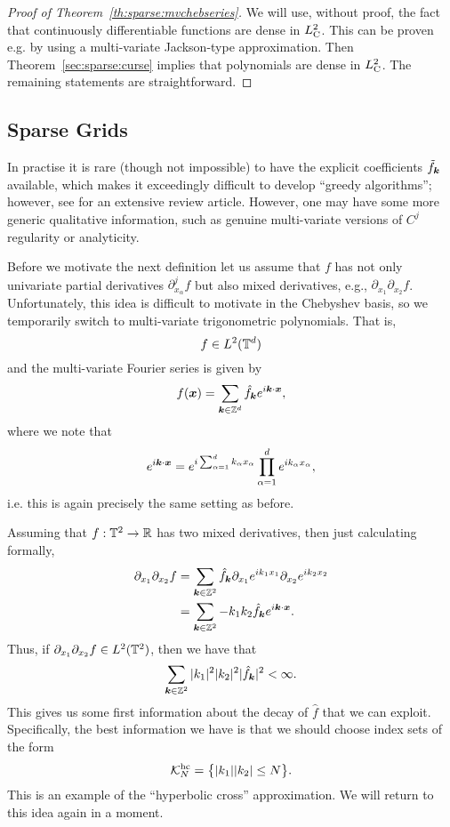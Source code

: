 \begin{proof}[Proof of Theorem~\ref{th:sparse:mvchebseries}]
    We will use, without proof, the fact that continuously differentiable
    functions are dense in $L^2_{\rm C}$. This can be proven e.g. by using a
    multi-variate Jackson-type approximation. Then Theorem~\ref{sec:sparse:curse}
    implies that polynomials are dense in $L^2_{\rm C}$. The remaining
    statements are straightforward.
\end{proof}



\subsection{Sparse Grids}
%
\label{sec:sparse:sparse}
%
In practise it is rare (though not impossible) to have the explicit coefficients
$\tilde{f}_{\bm k}$ available, which makes it exceedingly difficult to develop
``greedy algorithms''; however, see \cite{DeVore1998-do} for an extensive review
article. However, one may have some more generic qualitative information,
such as genuine multi-variate versions of $C^j$ regularity or analyticity.

Before we motivate the next definition let us assume that $f$ has not only
univariate partial derivatives $\partial_{x_\alpha}^j f$ but also mixed
derivatives, e.g., $\partial_{x_1} \partial_{x_2} f$. Unfortunately, this
idea is difficult to motivate in the Chebyshev basis, so we temporarily
switch to multi-variate trigonometric polynomials. That is,
\[
    f \in L^2(\mathbb{T}^d)
\]
and the multi-variate Fourier series is given by
\[
    f({\bm x}) = \sum_{{\bm k} \in \mathbb{Z}^d} \hat{f}_{\bm k}
        e^{i {\bm k}\cdot {\bm x}},
\]
where we note that
\[
    e^{i {\bm k}\cdot {\bm x}} =
    e^{i \sum_{\alpha = 1}^d k_\alpha x_\alpha}
    \prod_{\alpha = 1}^d e^{i k_\alpha x_\alpha},
\]
i.e. this is again precisely the same setting as before.

Assuming that $f : \mathbb{T}^2 \to \mathbb{R}$ has two mixed derivatives, then just
calculating formally,
\begin{align*}
    \partial_{x_1} \partial_{x_2} f
    &=
    \sum_{{\bm k} \in \mathbb{Z}^2} \hat{f}_{\bm k}
    \partial_{x_1} e^{ik_1x_1} \partial_{x_2} e^{ik_2x_2} \\
    &=
    \sum_{{\bm k} \in \mathbb{Z}^2} - k_1 k_2 \hat{f}_{\bm k}
    e^{i {\bm k} \cdot {\bm x}}.
\end{align*}
Thus, if $\partial_{x_1} \partial_{x_2} f  \in L^2(\mathbb{T}^2)$, then we have
that
\[
    \sum_{{\bm k} \in \mathbb{Z}^2} |k_1|^2 |k_2|^2 |\hat{f}_{{\bm k}}|^2 < \infty.
\]
This gives us some first information about the decay of $\hat{f}$ that we
can exploit. Specifically, the best information we have is that we should choose
index sets of the form
\[
    \mathcal{K}_N^{\rm hc} =  \big\{
            |k_1| |k_2| \leq N \big\}.
\]
This is an example of the ``hyperbolic cross'' approximation. We will
return to this idea again in a moment.

